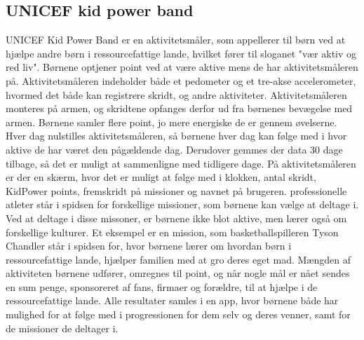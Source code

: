 \subsection{UNICEF kid power band}
UNICEF Kid Power Band er en aktivitetsmåler, som appellerer til børn ved at hjælpe andre børn i ressourcefattige lande, hvilket fører til sloganet "vær aktiv og red liv". Børnene optjener point ved at være  aktive mens de har aktivitetsmåleren på. Aktivitetsmåleren indeholder både et pedometer og et tre-akse accelerometer, hvormed det både kan registrere skridt, og andre aktiviteter. Aktivitetsmåleren monteres på armen, og skridtene opfanges derfor ud fra børnenes bevægelse med armen. Børnene samler flere point, jo mere energiske de er gennem øvelserne. Hver dag nulstilles aktivitetsmåleren, så børnene hver dag kan følge med i hvor aktive de har været den pågældende dag. Derudover gemmes der data 30 dage tilbage, så det er muligt at sammenligne med tidligere dage. På aktivitetsmåleren er der en skærm, hvor det er muligt at følge med i klokken, antal skridt, KidPower points, fremskridt på missioner og navnet på brugeren.\citep{PowerAbout2015,PowerManual2015} \newline 
professionelle atleter står i spidsen for forskellige missioner, som børnene kan vælge at deltage i. Ved at deltage i disse missoner, er børnene ikke blot aktive, men lærer også om forskellige kulturer. Et eksempel er en mission, som basketballspilleren Tyson Chandler står i spidsen for, hvor børnene lærer om hvordan børn i ressourcefattige lande, hjælper familien med at gro deres eget mad.\citep{PowerMission2015} \newline
Mængden af aktiviteten børnene udfører, omregnes til point, og når nogle mål er nået sendes en sum penge, sponsoreret af fans, firmaer og forældre, til at hjælpe i de ressourcefattige lande. \newline
Alle resultater samles i en app, hvor børnene både har mulighed for at følge med i progressionen for dem selv og deres venner, samt for de missioner de deltager i.\citep{PowerAbout2015}


